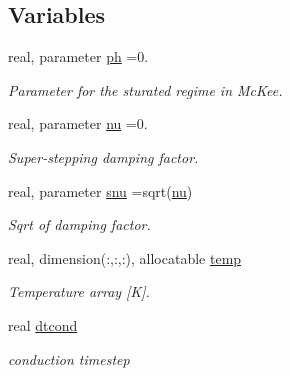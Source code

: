 \subsection*{Variables}
\begin{DoxyCompactItemize}
\item 
\hypertarget{namespacethermal__cond_a37c3e000231baaaa4668f7c05f021ce0}{}real, parameter \hyperlink{namespacethermal__cond_a37c3e000231baaaa4668f7c05f021ce0}{ph} =0.\label{namespacethermal__cond_a37c3e000231baaaa4668f7c05f021ce0}

\begin{DoxyCompactList}\small\item\em Parameter for the sturated regime in Mc\+Kee. \end{DoxyCompactList}\item 
\hypertarget{namespacethermal__cond_a38896e6bbd3b053ca066e407e4b3817f}{}real, parameter \hyperlink{namespacethermal__cond_a38896e6bbd3b053ca066e407e4b3817f}{nu} =0.\label{namespacethermal__cond_a38896e6bbd3b053ca066e407e4b3817f}

\begin{DoxyCompactList}\small\item\em Super-\/stepping damping factor. \end{DoxyCompactList}\item 
\hypertarget{namespacethermal__cond_a53b14d15ce11990f6453a335c81d1728}{}real, parameter \hyperlink{namespacethermal__cond_a53b14d15ce11990f6453a335c81d1728}{snu} =sqrt(\hyperlink{namespacethermal__cond_a38896e6bbd3b053ca066e407e4b3817f}{nu})\label{namespacethermal__cond_a53b14d15ce11990f6453a335c81d1728}

\begin{DoxyCompactList}\small\item\em Sqrt of damping factor. \end{DoxyCompactList}\item 
\hypertarget{namespacethermal__cond_a35e92d8dd3107b43d3326f014577fa9e}{}real, dimension(\+:,\+:,\+:), allocatable \hyperlink{namespacethermal__cond_a35e92d8dd3107b43d3326f014577fa9e}{temp}\label{namespacethermal__cond_a35e92d8dd3107b43d3326f014577fa9e}

\begin{DoxyCompactList}\small\item\em Temperature array \mbox{[}K\mbox{]}. \end{DoxyCompactList}\item 
\hypertarget{namespacethermal__cond_a59c290133a4485e731bfc0185d006091}{}real \hyperlink{namespacethermal__cond_a59c290133a4485e731bfc0185d006091}{dtcond}\label{namespacethermal__cond_a59c290133a4485e731bfc0185d006091}

\begin{DoxyCompactList}\small\item\em conduction timestep \end{DoxyCompactList}\end{DoxyCompactItemize}


